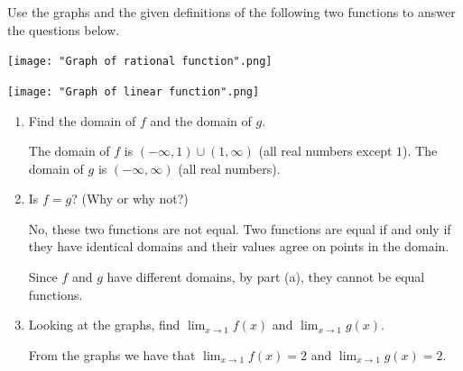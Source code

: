 \documentclass[nooutcomes]{ximera}
\begin{document}
\begin{problem}
Use the graphs and the given definitions of the following two functions to answer the questions below.
	
	\begin{image}

    \texttt{[image: "Graph of rational function".png]}
  \end{image}
\begin{image}
        \texttt{[image: "Graph of linear function".png]}
  \end{image}

	\begin{enumerate}
	
	  \item Find the domain of $f$ and the domain of $g$.
      \begin{freeResponse}
        The domain of $f$ is $(-\infty, 1) \cup (1, \infty)$ (all real numbers except $1$).
        The domain of $g$ is $(-\infty, \infty)$ (all real numbers).
      \end{freeResponse}
	
  	\item Is $f = g$?
      (Why or why not?)
      \begin{freeResponse}
        No, these two functions are not equal.
        Two functions are equal if and only if they have identical domains and their values agree on points in the domain.

        Since $f$ and $g$ have different domains, by part (a), they cannot be equal functions.
	\end{freeResponse}
	
	 \item  Looking at the graphs, find $\lim_{x \to 1} f(x)$ and $\lim_{x \to 1} g(x)$.
      \begin{freeResponse}
        From the graphs we have that $\lim_{x \to 1} f(x) = 2$ and $\lim_{x \to 1} g(x) = 2$.
      \end{freeResponse}

	\end{enumerate}
\end{problem}
			
\end{document}
